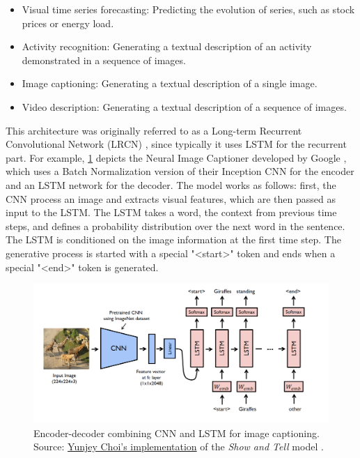 \begin{itemize}
    \item Visual time series forecasting: Predicting the evolution of series, such as stock prices or energy load.
    \item Activity recognition: Generating a textual description of an activity demonstrated in a sequence of images.
    \item Image captioning: Generating a textual description of a single image.
    \item Video description: Generating a textual description of a sequence of images.
\end{itemize}

This architecture was originally referred to as a Long-term Recurrent Convolutional Network (LRCN) \citep{Donahue2015}, since typically it uses LSTM for the recurrent part. For example, \cref{fig:cnn-rnn} depicts the Neural Image Captioner developed by Google \citep{Vinyals2015}, which uses a Batch Normalization version of their Inception CNN for the encoder and an LSTM network for the decoder. The model works as follows: first, the CNN process an image and extracts visual features, which are then passed as input to the LSTM. The LSTM takes a word, the context from previous time steps, and defines a probability distribution over the next word in the sentence. The LSTM is conditioned on the image information at the first time step. The generative process is started with a special "<start>" token and ends when a special "<end>" token is generated.

\begin{figure}[hpt]
    \centering
    \includegraphics[scale=0.3]{images/ch3/cnn-rnn.png}
    \caption{Encoder-decoder combining CNN and LSTM for image captioning. Source:  \href{https://github.com/yunjey/pytorch-tutorial/tree/master/tutorials/03-advanced/image_captioning}{Yunjey Choi's implementation} of the \textit{Show and Tell} model \citep{Vinyals2015}.}
    \label{fig:cnn-rnn}
\end{figure}

